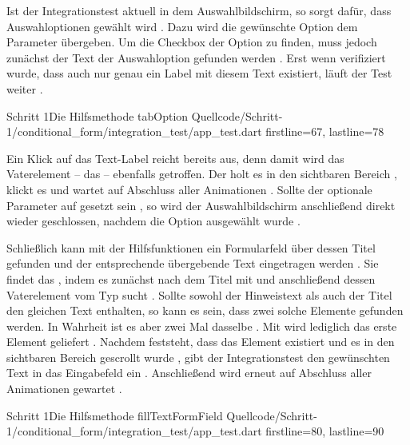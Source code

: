Ist der Integrationstest aktuell in dem Auswahlbildschirm, so sorgt  dafür, dass Auswahloptionen gewählt wird \Lst{\ref{lst:Schritt1HilfsmethodeTabOption}}.
Dazu wird die gewünschte Option dem Parameter  übergeben.
Um die Checkbox der Option zu finden, muss jedoch zunächst der Text der Auswahloption gefunden werden .
Erst wenn verifiziert wurde, dass auch nur genau ein Label mit diesem Text existiert, läuft der Test weiter . 

\begin{alexlisting}{Schritt 1}{Die Hilfsmethode tabOption}
  {Quellcode/Schritt-1/conditional_form/integration_test/app_test.dart}
  {firstline=67, lastline=78}
  \label{lst:Schritt1HilfsmethodeTabOption}
\end{alexlisting}

Ein Klick auf das Text-Label reicht bereits aus, denn damit wird das Vaterelement -- das  -- ebenfalls getroffen.
Der  holt es in den sichtbaren Bereich , klickt es  und wartet auf Abschluss aller Animationen .
Sollte der optionale Parameter  auf  gesetzt sein , so wird der Auswahlbildschirm anschließend direkt wieder geschlossen, nachdem die Option ausgewählt wurde  . 
  
Schließlich kann mit der Hilfsfunktionen  ein Formularfeld über dessen Titel gefunden und der entsprechende übergebende Text eingetragen werden \Lst{\ref{lst:Schritt1HilfsmethodeFillTextFormField}}.
Sie findet das , indem es zunächst nach dem Titel mit  und anschließend dessen Vaterelement vom Typ  sucht . Sollte sowohl der Hinweistext als auch der Titel den gleichen Text enthalten, so kann es sein, dass zwei solche Elemente gefunden werden. In Wahrheit ist es aber zwei Mal dasselbe . Mit  wird lediglich das erste Element geliefert .
Nachdem feststeht, dass das Element existiert  und es in den sichtbaren Bereich gescrollt wurde , gibt der Integrationstest den gewünschten Text in das Eingabefeld ein .
Anschließend wird erneut auf Abschluss aller Animationen gewartet .

\begin{alexlisting}{Schritt 1}{Die Hilfsmethode fillTextFormField}
  {Quellcode/Schritt-1/conditional_form/integration_test/app_test.dart}
  {firstline=80, lastline=90}
  \label{lst:Schritt1HilfsmethodeFillTextFormField}
\end{alexlisting}

